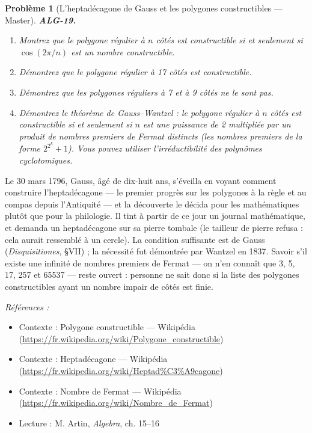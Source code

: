 \documentclass[11pt]{article}
\newtheorem{problem}{Problème}
\newenvironment{refs}{\par\small\noindent\emph{Références :}\begin{itemize}\setlength\itemsep{0pt}}{\end{itemize}\normalsize}
\begin{document}
\bigskip

\begin{problem}[{L'heptadécagone de Gauss et les polygones constructibles --- Master}]
\textbf{ALG-19.} \begin{enumerate}
\item[(i)] Montrez que le polygone régulier à $n$ côtés est constructible si et
seulement si $\cos(2\pi/n)$ est un nombre constructible.
\item[(ii)] Démontrez que le polygone régulier à 17
côtés est constructible.
\item[(iii)] Démontrez que les polygones réguliers à 7 et à 9 côtés ne le sont pas.
\item[(iv)] Démontrez le
théorème de Gauss--Wantzel : le polygone régulier à $n$ côtés est constructible si et seulement si $n$ est
une puissance de 2 multipliée par un produit de nombres premiers de Fermat distincts (les nombres premiers de
la forme $2^{2^k} + 1$). Vous pouvez utiliser l'irréductibilité des polynômes cyclotomiques.
\end{enumerate}

\end{problem}

\noindent Le 30 mars 1796, Gauss, âgé de dix-huit ans, s'éveilla en voyant comment construire
l'heptadécagone --- le premier progrès sur les polygones à la règle et au compas depuis l'Antiquité --- et la
découverte le décida pour les mathématiques plutôt que pour la philologie. Il tint à partir de ce jour un
journal mathématique, et demanda un heptadécagone sur sa pierre tombale (le tailleur de pierre refusa : cela
aurait ressemblé à un cercle). La condition suffisante est de Gauss (\textit{Disquisitiones}, \S{}VII) ; la
nécessité fut démontrée par Wantzel en 1837. Savoir s'il existe une infinité de nombres premiers de Fermat ---
on n'en connaît que 3, 5, 17, 257 et 65537 --- reste ouvert : personne ne sait donc si la liste des polygones
constructibles ayant un nombre impair de côtés est finie.

\begin{refs}
\item Contexte : Polygone constructible --- Wikipédia (\url{https://fr.wikipedia.org/wiki/Polygone_constructible})
\item Contexte : Heptadécagone --- Wikipédia (\url{https://fr.wikipedia.org/wiki/Heptad%C3%A9cagone})
\item Contexte : Nombre de Fermat --- Wikipédia (\url{https://fr.wikipedia.org/wiki/Nombre_de_Fermat})
\item Lecture : M. Artin, \textit{Algebra}, ch. 15--16
\end{refs}
\end{document}
